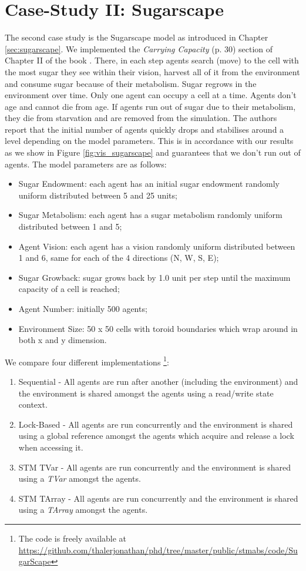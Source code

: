 \section{Case-Study II: Sugarscape}
\label{sec:sugarscape_concurrent}
The second case study is the Sugarscape model as introduced in Chapter \ref{sec:sugarscape}. We implemented the \textit{Carrying Capacity} (p. 30) section of Chapter II of the book \cite{epstein_growing_1996}. There, in each step agents search (move) to the cell with the most sugar they see within their vision, harvest all of it from the environment and consume sugar because of their metabolism. Sugar regrows in the environment over time. Only one agent can occupy a cell at a time. Agents don't age and cannot die from age. If agents run out of sugar due to their metabolism, they die from starvation and are removed from the simulation. The authors report that the initial number of agents quickly drops and stabilises around a level depending on the model parameters. This is in accordance with our results as we show in Figure \ref{fig:vis_sugarscape} and guarantees that we don't run out of agents. The model parameters are as follows:

\begin{itemize}
	\item Sugar Endowment: each agent has an initial sugar endowment randomly uniform distributed between 5 and 25 units;
	\item Sugar Metabolism: each agent has a sugar metabolism randomly uniform distributed between 1 and 5;
	\item Agent Vision: each agent has a vision randomly uniform distributed between 1 and 6, same for each of the 4 directions (N, W, S, E);
	\item Sugar Growback: sugar grows back by 1.0 unit per step until the maximum capacity of a cell is reached;
	\item Agent Number: initially 500 agents;
	\item Environment Size: 50 x 50 cells with toroid boundaries which wrap around in both x and y dimension.
\end{itemize}

We compare four different implementations \footnote{The code is freely available at \url{https://github.com/thalerjonathan/phd/tree/master/public/stmabs/code/SugarScape}}:

\begin{enumerate}
	\item Sequential - All agents are run after another (including the environment) and the environment is shared amongst the agents using a read/write state context.
	\item Lock-Based - All agents are run concurrently and the environment is shared using a global reference amongst the agents which acquire and release a lock when accessing it.
	\item STM TVar - All agents are run concurrently and the environment is shared using a \textit{TVar} amongst the agents.
	\item STM TArray - All agents are run concurrently and the environment is shared using a \textit{TArray} amongst the agents. 
\end{enumerate}

